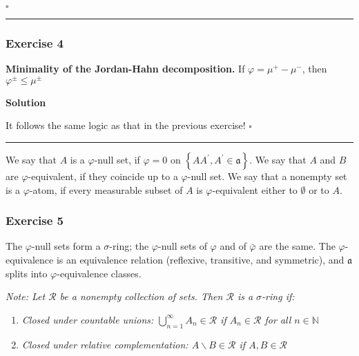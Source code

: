 \documentclass[
]{article}
\begin{document}
\(\square\)

\begin{center}\rule{0.5\linewidth}{0.5pt}\end{center}

\hypertarget{exercise-4}{%
  \subsubsection{Exercise 4}\label{exercise-4}}

\textbf{Minimality of the Jordan-Hahn decomposition.} If
\(\varphi=\mu^{+}-\mu^{-}\), then \(\varphi^{\pm} \le \mu^{\pm}\)

\textbf{Solution}

It follows the same logic as that in the previous exercise! \(\square\)

\begin{center}\rule{0.5\linewidth}{0.5pt}\end{center}

We say that \(A\) is a \(\varphi\)-null set, if \(\varphi=0\) on
\(\left\{A A^{\prime}, A^{\prime} \in \mathfrak{a}\right\}\). We say
that \(A\) and \(B\) are \(\varphi\)-equivalent, if they coincide up to
a \(\varphi\)-null set. We say that a nonempty set is a
\(\varphi\)-atom, if every measurable subset of \(A\) is
\(\varphi\)-equivalent either to \(\emptyset\) or to \(A\).

\hypertarget{exercise-5}{%
  \subsubsection{Exercise 5}\label{exercise-5}}

The \(\varphi\)-null sets form a \(\sigma\)-ring; the \(\varphi\)-null
sets of \(\varphi\) and of \(\bar{\varphi}\) are the same. The
\(\varphi\)-equivalence is an equivalence relation (reflexive,
transitive, and symmetric), and \(\mathfrak{a}\) splits into
\(\varphi\)-equivalence classes.

\emph{Note: Let \(\mathcal{R}\) be a nonempty collection of sets. Then
  \(\mathcal{R}\) is a \(\sigma\)-ring if:}

\begin{enumerate}
  \def\labelenumi{\arabic{enumi}.}
  \item
        \emph{Closed under countable unions:
          \(\bigcup_{n=1}^{\infty} A_n \in \mathcal{R}\) if
          \(A_n \in \mathcal{R}\) for all \(n \in \mathbb{N}\)}
  \item
        \emph{Closed under relative complementation:
          \(A \backslash B \in \mathcal{R}\) if \(A, B \in \mathcal{R}\)}
\end{enumerate}
\end{document}
